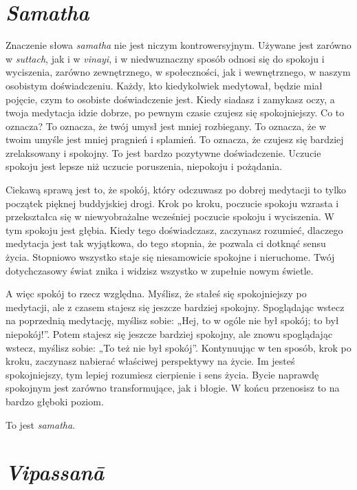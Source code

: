 \documentclass[12pt,openany]{book}
\begin{document}
\section*{\textit{Samatha}}

Znaczenie słowa \textit{samatha} nie jest niczym kontrowersyjnym. Używane jest zarówno w \textit{suttach}, jak i w \textit{vinayi}, i w niedwuznaczny sposób odnosi się do spokoju i wyciszenia, zarówno zewnętrznego, w społeczności, jak i wewnętrznego, w naszym osobistym doświadczeniu. Każdy, kto kiedykolwiek medytował, będzie miał pojęcie, czym to osobiste doświadczenie jest. Kiedy siadasz i zamykasz oczy, a twoja medytacja idzie dobrze, po pewnym czasie czujesz się spokojniejszy. Co to oznacza? To oznacza, że twój umysł jest mniej rozbiegany. To oznacza, że w twoim umyśle jest mniej pragnień i splamień. To oznacza, że czujesz się bardziej zrelaksowany i spokojny. To jest bardzo pozytywne doświadczenie. Uczucie spokoju jest lepsze niż uczucie poruszenia, niepokoju i pożądania.

Ciekawą sprawą jest to, że spokój, który odczuwasz po dobrej medytacji to tylko początek pięknej buddyjskiej drogi. Krok po kroku, poczucie spokoju wzrasta i przekształca się w niewyobrażalne wcześniej poczucie spokoju i wyciszenia. W tym spokoju jest głębia. Kiedy tego doświadczasz, zaczynasz rozumieć, dlaczego medytacja jest tak wyjątkowa, do tego stopnia, że pozwala ci dotknąć sensu życia. Stopniowo wszystko staje się niesamowicie spokojne i nieruchome. Twój dotychczasowy świat znika i widzisz wszystko w zupełnie nowym świetle.

A więc spokój to rzecz względna. Myślisz, że stałeś się spokojniejszy po medytacji, ale z czasem stajesz się jeszcze bardziej spokojny. Spoglądając wstecz na poprzednią medytację, myślisz sobie: „Hej, to w ogóle nie był spokój; to był niepokój!”. Potem stajesz się jeszcze bardziej spokojny, ale znowu spoglądając wstecz, myślisz sobie: „To też nie był spokój”. Kontynuując w ten sposób, krok po kroku, zaczynasz nabierać właściwej perspektywy na życie. Im jesteś spokojniejszy, tym lepiej rozumiesz cierpienie i sens życia. Bycie naprawdę spokojnym jest zarówno transformujące, jak i błogie. W końcu przenosisz to na bardzo głęboki poziom.

To jest \textit{samatha}.

\section*{\textit{Vipassanā}}
\end{document}
